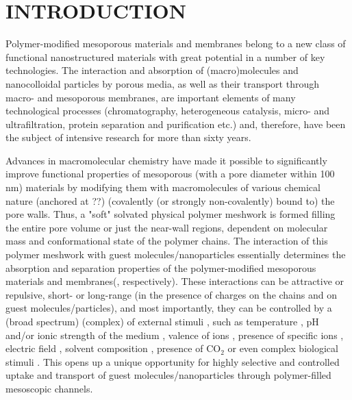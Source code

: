 \documentclass[12pt, a4paper]{article}
\begin{document}
\section{INTRODUCTION}


Polymer-modified mesoporous materials and membranes belong to a new class of functional nanostructured materials with great potential in a number of key technologies. 
The interaction and absorption of (macro)molecules and nanocolloidal particles by porous media, as well as their transport through macro- and mesoporous membranes, are important elements of many technological processes (chromatography, heterogeneous catalysis, micro- and ultrafiltration, protein separation and purification etc.) and, therefore, have been the subject of intensive research for more than sixty years.\cite{Watson1959, Rout2003, Huang2023, Uredat2024}

Advances in macromolecular chemistry have made it possible to significantly improve functional properties of mesoporous (with a pore diameter within 100 nm) 
materials by modifying them with macromolecules of various chemical nature (anchored at ??) (covalently (or strongly non-covalently) bound to) the pore walls. Thus, a "soft" solvated physical polymer meshwork is formed filling the entire pore volume or just the near-wall regions, dependent on molecular mass and conformational state of the polymer chains.
The interaction of this polymer meshwork with guest molecules/nanoparticles 
essentially determines the absorption and separation properties of the polymer-modified mesoporous materials and membranes(, respectively). 
These interactions can be attractive or repulsive, short- or long-range (in the presence of charges on the chains and on guest molecules/particles), and most importantly, 
they can be controlled by a (broad spectrum) (complex) of external stimuli \cite{Jeong2002, Lee2010, Low2019}, 
such as temperature                     \cite{Stetsyshyn2020}, 
pH and/or ionic strength of the medium  \cite{Dai2008, Zhang2005}, 
valence of ions                         \cite{Zhulina1999}, 
presence of specific ions               \cite{Robertson2021}, 
electric field                          \cite{Lokuge2005}, 
solvent composition                     \cite{Halperin2011}, 
presence of $\text{CO}_2$               \cite{Darabi2016} 
or even complex biological stimuli      \cite{Ikeda2010, Lu2003}.
This opens up a unique opportunity for highly selective and controlled uptake and transport of guest molecules/nanoparticles through polymer-filled mesoscopic channels. 
\end{document}
